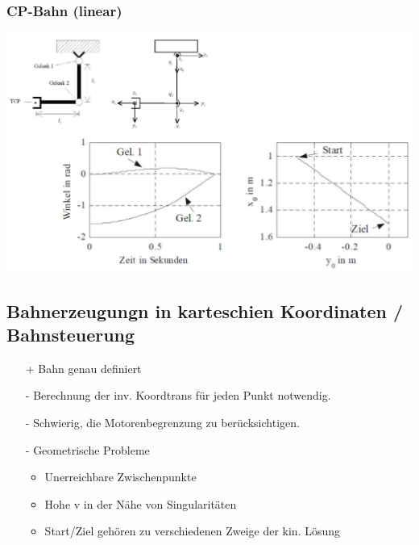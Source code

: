 \begin{multicols}{3}
\begin{minipage}{\linewidth}
        \subsubsection{CP-Bahn (linear)}
        \includegraphics[width=\linewidth]{./bilder/VBCPB}
    \end{minipage}
\end{multicols}
\clearpage  %
\subsection{Bahnerzeugungn in karteschien Koordinaten / Bahnsteuerung }
\begin{multicols}{2}
    \begin{itemize}
        \item[+] Bahn genau definiert
    \end{itemize}
    
    \begin{itemize}
        \item[-] Berechnung der inv. Koordtrans für jeden Punkt notwendig.
        \item[-] Schwierig, die Motorenbegrenzung zu berücksichtigen.
        \columnbreak
        \item[-] Geometrische Probleme
        \begin{itemize}
            \item Unerreichbare Zwischenpunkte
            \item Hohe v in der Nähe von Singularitäten
            \item Start/Ziel gehören zu verschiedenen Zweige der kin. Lösung
        \end{itemize}
    \end{itemize}
\end{multicols}


